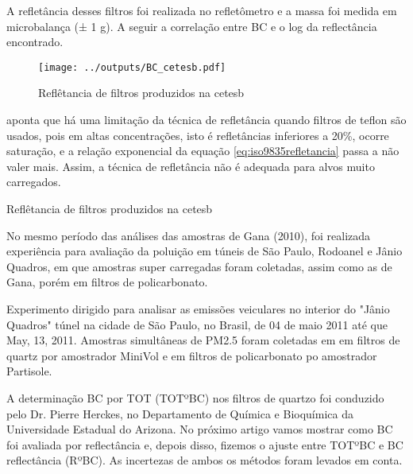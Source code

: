 A refletância desses filtros foi realizada no refletômetro e a massa foi medida 
em microbalança (± 1 g). A seguir a correlação entre BC e o log da reflectância
encontrado.

\begin{figure}[H]
  \centering
  \texttt{[image: ../outputs/BC\_cetesb.pdf]}
  \caption{Reflêtancia de filtros produzidos na cetesb}
\end{figure}

\citet{taha2007} aponta que há uma limitação da técnica de refletância quando 
filtros de teflon são usados, pois em altas concentrações, isto é refletâncias
inferiores a 20\%, ocorre saturação, e a relação exponencial da equação 
\ref{eq:iso9835refletancia} passa a não valer mais. Assim, a técnica de
refletância não é adequada para alvos muito carregados.

\newpage
\begin{table}[H]
  \centering
  \small
    
    \caption{Reflêtancia de filtros produzidos na cetesb}
\end{table} 
\newpage



No mesmo período das análises das amostras de Gana (2010), foi realizada 
experiência para avaliação da poluição em túneis de São Paulo, 
Rodoanel e Jânio Quadros, em que amostras super carregadas foram coletadas, 
assim como as de Gana, porém em filtros de policarbonato.


Experimento dirigido para analisar as emissões veiculares no interior do 
"Jânio Quadros" túnel na cidade de São Paulo, no Brasil, de 04 de maio 2011 
até que May, 13, 2011. Amostras simultâneas de PM2.5 foram coletadas em 
em filtros de quartz por amostrador MiniVol e em filtros de policarbonato 
po amostrador Partisole. 


A determinação BC por TOT (TOTºBC) nos filtros de quartzo foi conduzido pelo Dr. Pierre Herckes, no Departamento de Química e Bioquímica da Universidade Estadual do Arizona. No próximo artigo vamos mostrar como BC foi avaliada por reflectância e, depois disso, fizemos o ajuste entre TOTºBC e BC reflectância (RºBC). As incertezas de ambos os métodos foram levados em conta.


